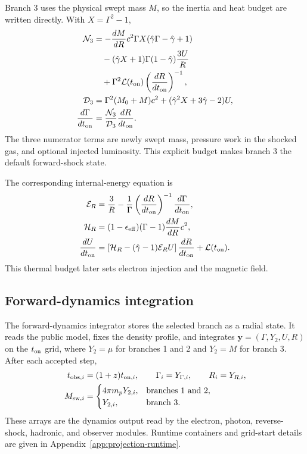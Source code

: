 \documentclass[twocolumn]{aastex702}
\begin{document}
Branch 3 uses the physical swept mass \(M\), so the inertia and heat budget are
written directly.  With \(X=\Gamma^2-1\),
\begin{equation}
\begin{aligned}
\mathcal{N}_3&=
-\frac{dM}{dR}c^2\Gamma X
(\hat{\gamma}\Gamma-\hat{\gamma}+1)\\
&\quad
-(\hat{\gamma}X+1)\Gamma(1-\hat{\gamma})\frac{3U}{R}\\
&\quad
+\Gamma^2\mathcal{L}(t_{\rm on})
\left(\frac{dR}{dt_{\rm on}}\right)^{-1},\\
\mathcal{D}_3&=
\Gamma^2(M_0+M)c^2+(\hat{\gamma}^2X+3\hat{\gamma}-2)U,\\
\frac{d\Gamma}{dt_{\rm on}}&=
\frac{\mathcal{N}_3}{\mathcal{D}_3}\frac{dR}{dt_{\rm on}} .
\end{aligned}
\end{equation}
The three numerator terms are newly swept mass, pressure work in the shocked gas,
and optional injected luminosity.  This explicit budget makes branch 3 the
default forward-shock state.

The corresponding internal-energy equation is
\begin{equation}
\begin{aligned}
\mathcal{E}_R &=
\frac{3}{R}
-\frac{1}{\Gamma}
\left(\frac{dR}{dt_{\rm on}}\right)^{-1}
\frac{d\Gamma}{dt_{\rm on}},\\
\mathcal{H}_R &=(1-\epsilon_{\rm eff})(\Gamma-1)
\frac{dM}{dR}c^2,\\
\frac{dU}{dt_{\rm on}}&=
\left[\mathcal{H}_R-(\hat{\gamma}-1)\mathcal{E}_R U\right]
\frac{dR}{dt_{\rm on}}
+\mathcal{L}(t_{\rm on}).
\end{aligned}
\end{equation}
This thermal budget later sets electron injection and the magnetic field.

\subsection{Forward-dynamics integration}

The forward-dynamics integrator stores the selected branch as a radial state.  It
reads the public model, fixes the density profile, and integrates
\(\mathbf{y}=(\Gamma,Y_2,U,R)\) on the \(t_{\rm on}\) grid, where \(Y_2=\mu\)
for branches 1 and 2 and \(Y_2=M\) for branch 3.  After each accepted step,
\begin{equation}
\begin{aligned}
t_{{\rm obs},i}&=(1+z)t_{{\rm on},i},\qquad
\Gamma_i=Y_{\Gamma,i},\qquad R_i=Y_{R,i},\\
M_{{\rm sw},i}&=
\begin{cases}
4\pi m_pY_{2,i},
& \text{branches 1 and 2},\\
Y_{2,i},
& \text{branch 3}.
\end{cases}
\end{aligned}
\end{equation}
These arrays are the dynamics output read by the electron, photon, reverse-shock,
hadronic, and observer modules.  Runtime containers and grid-start details are
given in Appendix~\ref{app:projection-runtime}.
\end{document}
